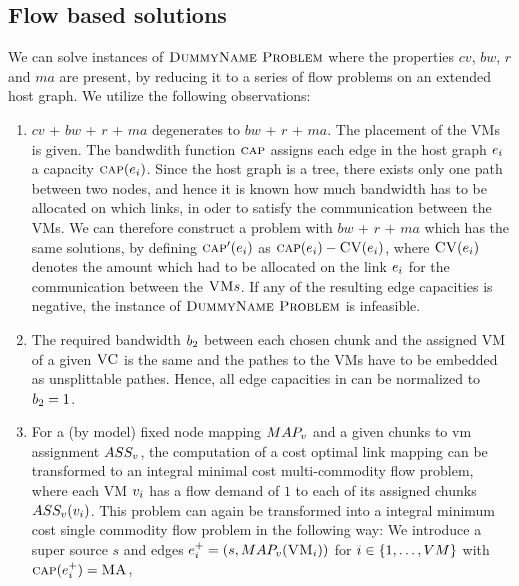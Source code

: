 \subsection{Flow based solutions}

We can solve instances of $\textsc{DummyName Problem}$ where the properties $cv$, $bw$, $r$ and 
$ma$
are present, by reducing it to a series of flow problems on an extended 
host graph. We utilize the following observations:

\newcommand{\Source}{\ensuremath{s}}
\newcommand{\Sink}{\ensuremath{t}}

\begin{enumerate}
\item $cv$ + $bw$ + $r$ + $ma$ degenerates to  $bw$ + $r$ + $ma$. 
The placement of the VMs is given. The bandwdith function $\textsc{cap}$ assigns 
each edge in the host graph $e_i$ a capacity 
$\textsc{cap}(e_i)$. Since the 
host graph is a tree, there exists only one path between two nodes, and hence 
it is known how much bandwidth has to be allocated on which links, in oder to 
satisfy the communication between the VMs. We can therefore construct a 
problem with $bw$ + $r$ + $ma$ which has the same solutions, by defining 
$\textsc{cap}'(e_i)$ as 
$\textsc{cap}(e_i) - \textsc{CV}(e_i)$, where 
$\textsc{CV}(e_i)$ denotes the amount which 
had to be allocated on the link $e_i$ for the communication 
between the $\textsc{VM} s$. If any of the resulting edge capacities is negative, the 
instance of $\textsc{DummyName Problem}$ is infeasible.
\item The required bandwidth $b_2$ between each chosen chunk and the 
assigned VM of a given $\textsc{VC}$ is 
the same and the pathes to the VMs have to be embedded as unsplittable 
pathes. Hence, all edge capacities in can be normalized to $b_2 = 1$.
\item For a (by model) fixed node mapping $MAP_v$ and a given chunks to 
vm assignment $ASS_v$, the computation of a cost 
optimal link mapping can be transformed to an integral minimal cost multi-commodity 
flow problem, where each VM $v_i$ has a flow demand of $1$ to each 
of its assigned chunks $ASS_v(v_i)$. This problem can 
again be transformed into a integral minimum cost single commodity flow problem 
in the following way: 
We introduce a 
super source $\Source$ and edges $\SubstrateEdge_i^+ = (\Source, 
\NodeMapping(\VM_i))$ for 
$i \in \{1,\dots,VM\}$ with $\textsc{cap}(e_i^+) = \textsc{MA}$, 

\end{enumerate}
